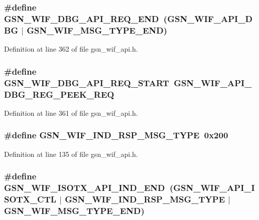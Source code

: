 \hypertarget{a00606_af92c532000365e8a7291db06368cc886}{
\subsubsection[{GSN\_\-WIF\_\-DBG\_\-API\_\-REQ\_\-END}]{\setlength{\rightskip}{0pt plus 5cm}\#define GSN\_\-WIF\_\-DBG\_\-API\_\-REQ\_\-END~(GSN\_\-WIF\_\-API\_\-DBG $|$ GSN\_\-WIF\_\-MSG\_\-TYPE\_\-END)}}
\label{a00606_af92c532000365e8a7291db06368cc886}


Definition at line 362 of file gsn\_\-wif\_\-api.h.

\hypertarget{a00606_ab5ab029cd4620155e8f98abad7c49f98}{
\subsubsection[{GSN\_\-WIF\_\-DBG\_\-API\_\-REQ\_\-START}]{\setlength{\rightskip}{0pt plus 5cm}\#define GSN\_\-WIF\_\-DBG\_\-API\_\-REQ\_\-START~GSN\_\-WIF\_\-API\_\-DBG\_\-REG\_\-PEEK\_\-REQ}}
\label{a00606_ab5ab029cd4620155e8f98abad7c49f98}


Definition at line 361 of file gsn\_\-wif\_\-api.h.

\hypertarget{a00606_a6a95cc2947a0ffdd6e579227f44eccb6}{
\subsubsection[{GSN\_\-WIF\_\-IND\_\-RSP\_\-MSG\_\-TYPE}]{\setlength{\rightskip}{0pt plus 5cm}\#define GSN\_\-WIF\_\-IND\_\-RSP\_\-MSG\_\-TYPE~0x200}}
\label{a00606_a6a95cc2947a0ffdd6e579227f44eccb6}


Definition at line 135 of file gsn\_\-wif\_\-api.h.

\hypertarget{a00606_aa96d7be65446e0dadc82d200a3c45c21}{
\subsubsection[{GSN\_\-WIF\_\-ISOTX\_\-API\_\-IND\_\-END}]{\setlength{\rightskip}{0pt plus 5cm}\#define GSN\_\-WIF\_\-ISOTX\_\-API\_\-IND\_\-END~(GSN\_\-WIF\_\-API\_\-ISOTX\_\-CTL $|$ GSN\_\-WIF\_\-IND\_\-RSP\_\-MSG\_\-TYPE $|$ GSN\_\-WIF\_\-MSG\_\-TYPE\_\-END)}}
\label{a00606_aa96d7be65446e0dadc82d200a3c45c21}


